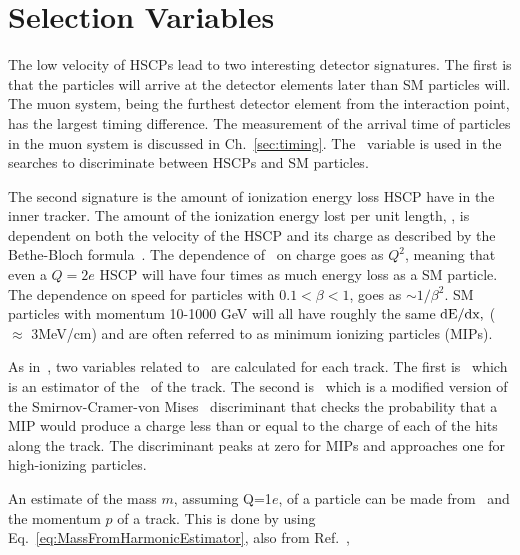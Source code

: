 \section{Selection Variables \label{sec:SelVar}}
The low velocity of HSCPs lead to two interesting detector signatures. The first is that the particles will arrive at the detector elements later than SM particles will.
The muon system, being the furthest detector element from the interaction point, has the largest timing difference. The measurement of the arrival time of particles in the
muon system is discussed in Ch.~\ref{sec:timing}. The \invbeta\ variable is used in the searches to discriminate between HSCPs and SM particles.

The second signature is the amount of ionization energy loss HSCP have in the inner tracker.
The amount of the ionization energy lost per unit length, \dedx, is dependent on both the velocity of the HSCP and its charge as described by the Bethe-Bloch formula~\cite{PDG}.
The dependence of \dedx\  on charge goes as $Q^2$, meaning that even a $Q=2e$ HSCP will have four times as much energy loss as a SM particle.
The dependence on speed for particles with $0.1 < \beta < 1$, goes as $\sim 1/\beta^2$.
SM particles with momentum 10-1000 GeV will all have roughly the same $\dedx,$ ($\approx$ 3MeV/cm) and are often referred to as minimum ionizing particles (MIPs).

As in~\cite{Chatrchyan:2012sp}, two variables related to \dedx\ are calculated for each track. The first is \ih\ which is an estimator of the \dedx\ of the track.
The second is \ias\ which is a modified version of the Smirnov-Cramer-von Mises~\cite{Eadie, James} discriminant that checks
the probability that a MIP would produce a charge less than or equal to the charge of each of the hits
along the track. The discriminant peaks at zero for MIPs and approaches one for high-ionizing particles. 


An estimate of the mass $m$, assuming Q=1$e$, of a particle can be made from \ih\ and the momentum $p$ of a track. This is done by using Eq.~\ref{eq:MassFromHarmonicEstimator},
also from Ref.~\cite{Chatrchyan:2012sp},

